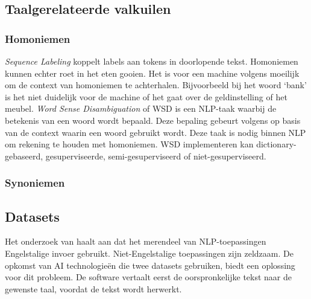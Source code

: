 \subsection{Taalgerelateerde valkuilen}

\subsubsection{Homoniemen}

\textit{Sequence Labeling} koppelt labels aan tokens in doorlopende tekst. Homoniemen kunnen echter roet in het eten gooien. Het is voor een machine volgens \textcite{Roldos2020} moeilijk om de context van homoniemen te achterhalen. Bijvoorbeeld bij het woord ‘bank’ is het niet duidelijk voor de machine of het gaat over de geldinstelling of het meubel. \textit{Word Sense Disambiguation} of WSD is een NLP-taak waarbij de betekenis van een woord wordt bepaald. Deze bepaling gebeurt volgens \autocite{Eisenstein2019} op basis van de context waarin een woord gebruikt wordt. Deze taak is nodig binnen NLP om rekening te houden met homoniemen. WSD implementeren kan dictionary-gebaseerd, gesuperviseerde, semi-gesuperviseerd of niet-gesuperviseerd.

\subsubsection{Synoniemen}



\subsection{Datasets}

Het onderzoek van \textcite{Sciforce2020} haalt aan dat het merendeel van NLP-toepassingen Engelstalige invoer gebruikt. Niet-Engelstalige toepassingen zijn zeldzaam. De opkomst van AI technologieën die twee datasets gebruiken, biedt een oplossing voor dit probleem. De software vertaalt eerst de oorspronkelijke tekst naar de gewenste taal, voordat de tekst wordt herwerkt. 




